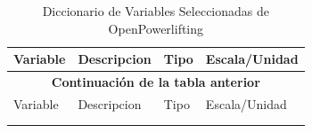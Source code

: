 \documentclass[letter]{article}
\begin{document}
\begin{longtable}{lp{8cm}ll}
\caption{Diccionario de Variables Seleccionadas de OpenPowerlifting}
\label{tab:variables_opl_filtradas} \\
\toprule
Variable & Descripcion & Tipo & Escala/Unidad \\
\midrule
\endfirsthead

\multicolumn{4}{c}{{\bfseries Continuación de la tabla anterior}} \\
\toprule
Variable & Descripcion & Tipo & Escala/Unidad \\
\midrule
\endhead

\midrule
\multicolumn{4}{r}{{}} \\
\endfoot

\bottomrule
\endlastfoot


\end{longtable}
\end{document}
